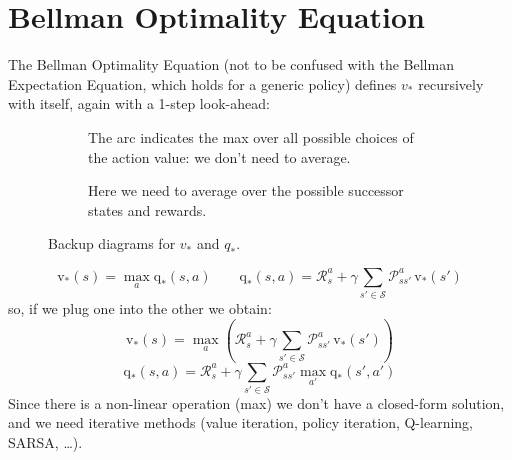 \section{Bellman Optimality Equation}
The Bellman Optimality Equation (not to be confused with the Bellman Expectation Equation, which holds for a generic policy) defines $v_*$ recursively with itself, again with a 1-step look-ahead:
\begin{figure}[H]
\centering
{}
\begin{subfigure}[t]{0.48\textwidth}
  \centering
  \caption{The arc indicates the max over all possible choices of the
  action value: we don't need to average.}
  \label{fig:backup-vstar}
\end{subfigure}
\hfill
\begin{subfigure}[t]{0.48\textwidth}
  \centering
  \caption{Here we need to average over the possible successor states
  and rewards.}
  \label{fig:backup-qstar}
\end{subfigure}
\caption{Backup diagrams for $v_*$ and $q_*$.}
\label{fig:backup-optimal}
\end{figure}
\[\mathrm{v}_*(s)=\max_a\mathrm{q}_*(s,a)\qquad \mathrm{q}_*(s,a)=\mathcal{R}_s^a+\gamma\sum_{s'\in\mathcal{S}}\mathcal{P}_{ss'}^a\,\mathrm{v}_*(s')\]
so, if we plug one into the other we obtain:
\[\mathrm{v}_*(s)=\max_a\left(\mathcal{R}_s^a+\gamma\sum_{s'\in\mathcal{S}}\mathcal{P}_{ss'}^a\,\mathrm{v}_*(s')\right)\]
\[\mathrm{q}_*(s,a)=\mathcal{R}_s^a+\gamma\sum_{s'\in\mathcal{S}}\mathcal{P}_{ss'}^a\max_{a'}\mathrm{q}_*(s',a')\]
Since there is a non-linear operation (max) we don't have a closed-form solution, and we need iterative methods (value iteration, policy iteration, Q-learning, SARSA, \dots).


